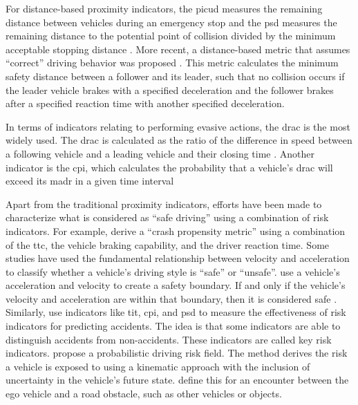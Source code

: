For distance-based proximity indicators, the \ac{picud} measures the remaining distance between vehicles during an emergency stop \autocite{iida2001traffic, uno2003objective} and the \ac{psd} measures the remaining distance to the potential point of collision divided by the minimum acceptable stopping distance \autocite{allen1978analysis, guido2011comparing, mahmud2017application}. 
More recent, a distance-based metric that assumes ``correct'' driving behavior was proposed \autocite{shalev2017formal}. 
This metric calculates the minimum safety distance between a follower and its leader, such that no collision occurs if the leader vehicle brakes with a specified deceleration and the follower brakes after a specified reaction time with another specified deceleration. 

In terms of indicators relating to performing evasive actions, the \ac{drac} is the most widely used. 
The \ac{drac} is calculated as the ratio of the difference in speed between a following vehicle and a leading vehicle and their closing time \autocite{almqvist1991use, mahmud2017application}. 
Another indicator is the \ac{cpi}, which calculates the probability that a vehicle's \ac{drac} will exceed its \ac{madr} in a given time interval \autocite{cunto2009simulated} 


Apart from the traditional proximity indicators, efforts have been made to characterize what is considered as ``safe driving'' using a combination of risk indicators.
For example, \textcite{wang2014evaluation} derive a ``crash propensity metric'' using a combination of the \ac{ttc}, the vehicle braking capability, and the driver reaction time.
Some studies have used the fundamental relationship between velocity and acceleration to classify whether a vehicle's driving style  is ``safe'' or ``unsafe''. 
\textcite{eboli2016combining} use a vehicle's acceleration and velocity to create a safety boundary.
If and only if the vehicle's velocity and acceleration are within that boundary, then it is considered safe \autocite{eboli2016combining}.
Similarly, \textcite{shi2018key} use indicators like \ac{tit}, \ac{cpi}, and \ac{psd} to measure the effectiveness of risk indicators for predicting accidents. 
The idea is that some indicators are able to distinguish accidents from non-accidents. 
These indicators are called key risk indicators. 
\textcite{mullakkal2020probabilistic} propose a probabilistic driving risk field.
The method derives the risk a vehicle is exposed to using a kinematic approach with the inclusion of uncertainty in the vehicle's future state. 
\textcite{mullakkal2020probabilistic} define this for an encounter between the ego vehicle and a road obstacle, such as other vehicles or objects. 
